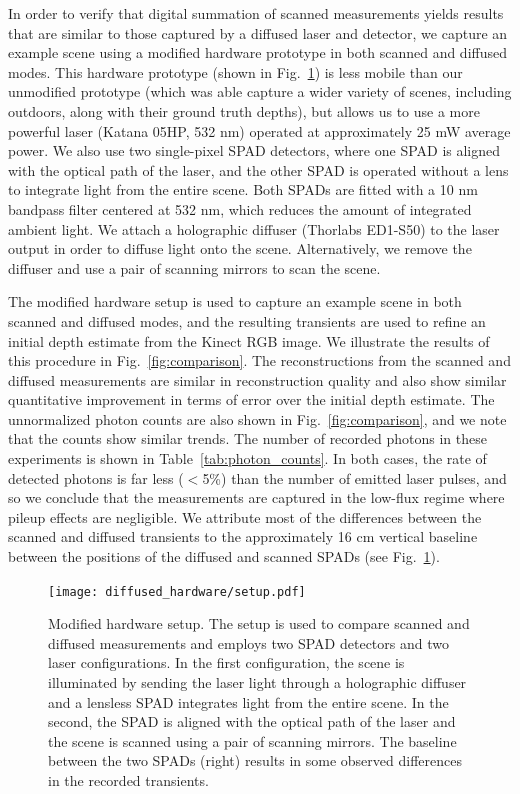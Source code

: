 \documentclass[runningheads]{llncs}
\begin{document}
In order to verify that digital summation of scanned measurements yields results
that are similar to those captured by a diffused laser and detector, we capture
an example scene using a modified hardware prototype in both scanned and
diffused modes. This hardware prototype (shown in Fig.~\ref{fig:hardware}) is less mobile than 
our unmodified prototype (which was able capture a wider variety of scenes,
including outdoors, along with their ground truth
depths), but allows us to use a more powerful laser (Katana 05HP, 532 nm)
operated at approximately 25 mW average power. We also use two single-pixel SPAD
detectors, where one SPAD is aligned with the optical path of the laser, and the
other SPAD is operated without a lens to integrate light from the entire scene.
Both SPADs are fitted with a 10 nm bandpass filter centered at 532 nm, which
reduces the amount of integrated ambient light. We attach a holographic diffuser
(Thorlabs ED1-S50) to the laser output in order to diffuse light onto the scene.
Alternatively, we remove the diffuser and use a pair of scanning mirrors to scan
the scene.

The modified hardware setup is used to capture an example scene in both scanned and
diffused modes, and the resulting transients are used to refine an initial depth
estimate from the Kinect RGB image. We illustrate the results of this procedure
in Fig.~\ref{fig:comparison}. The reconstructions from the scanned and diffused
measurements are similar in reconstruction quality and also show similar
quantitative improvement in terms of error over the initial depth estimate. The
unnormalized photon counts are also shown in Fig.~\ref{fig:comparison}, and we
note that the counts show similar trends. The number of recorded photons in
these experiments is shown in Table~\ref{tab:photon_counts}. In both cases, the
rate of detected photons is far less ($<$5\%) than the number of emitted laser
pulses, and so we conclude that the measurements are captured in the low-flux
regime where pileup effects are negligible. We attribute most of the differences
between the scanned and diffused transients to the approximately 16 cm vertical
baseline between the positions of the diffused and scanned SPADs (see
Fig.~\ref{fig:hardware}).
\begin{figure}[ht!]
  \centering \texttt{[image: diffused\_hardware/setup.pdf]}
  \caption{Modified hardware setup. The setup is used to compare scanned and
  diffused measurements and employs two SPAD detectors and two laser
  configurations. In the first configuration, the scene is illuminated by
  sending the laser light through a holographic diffuser and a lensless SPAD
  integrates light from the entire scene. In the second, the SPAD is aligned
  with the optical path of the laser and the scene is scanned using a pair of
  scanning mirrors. The baseline between the two SPADs (right) results in some
  observed differences in the recorded transients.}
  \label{fig:hardware}
\end{figure}
\end{document}

